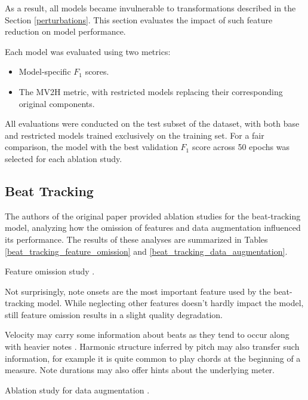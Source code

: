 As a result, all models became invulnerable to transformations described in the Section \ref{perturbations}. This section evaluates the impact of such feature reduction on model performance.

Each model was evaluated using two metrics:
\begin{itemize} \item Model-specific $F_1$ scores. \item The MV2H metric, with restricted models replacing their corresponding original components. \end{itemize}

All evaluations were conducted on the test subset of the dataset, with both base and restricted models trained exclusively on the training set. For a fair comparison, the model with the best validation $F_1$ score across 50 epochs was selected for each ablation study.

\subsection{Beat Tracking} \label{beat_tracking}

The authors of the original paper provided ablation studies for the beat-tracking model, analyzing how the omission of features and data augmentation influenced its performance. The results of these analyses are summarized in Tables \ref{beat_tracking_feature_omission} and \ref{beat_tracking_data_augmentation}.

\begin{table}[ht!]
\centering

\caption[Feature omission study.]{Feature omission study \cite{Liu2022}.}
\label{beat_tracking_feature_omission}
\end{table}

Not surprisingly, note onsets are the most important feature used by the beat-tracking model. While neglecting other features doesn't hardly impact the model, still feature omission results in a slight quality degradation.

Velocity may carry some information about beats as they tend to occur along with heavier notes \cite{Liu2022}. Harmonic structure inferred by pitch may also transfer such information, for example it is quite common to play chords at the beginning of a measure. Note durations may also offer hints about the underlying meter.

\begin{table}[ht!]
\centering

\caption[Ablation study for data augmentation.]{Ablation study for data augmentation \cite{Liu2022}.}
\label{beat_tracking_data_augmentation}
\end{table}

